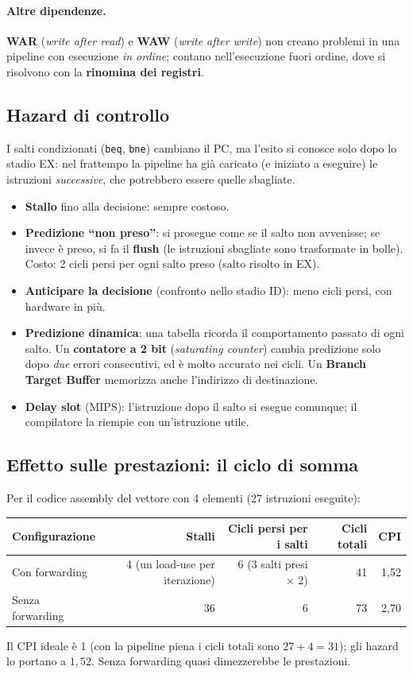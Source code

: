 \paragraph{Altre dipendenze.} \textbf{WAR} (\emph{write after read}) e \textbf{WAW} (\emph{write after write}) non creano problemi in una pipeline con esecuzione \emph{in ordine}; contano nell'esecuzione fuori ordine, dove si risolvono con la \textbf{rinomina dei registri}.

\subsection{Hazard di controllo}
I salti condizionati (\texttt{beq}, \texttt{bne}) cambiano il PC, ma l'esito si conosce solo dopo lo stadio EX: nel frattempo la pipeline ha già caricato (e iniziato a eseguire) le istruzioni \emph{successive}, che potrebbero essere quelle sbagliate.
\begin{itemize}
    \item \textbf{Stallo} fino alla decisione: sempre costoso.
    \item \textbf{Predizione ``non preso''}: si prosegue come se il salto non avvenisse; se invece è preso, si fa il \textbf{flush} (le istruzioni sbagliate sono trasformate in bolle). Costo: 2 cicli persi per ogni salto preso (salto risolto in EX).
    \item \textbf{Anticipare la decisione} (confronto nello stadio ID): meno cicli persi, con hardware in più.
    \item \textbf{Predizione dinamica}: una tabella ricorda il comportamento passato di ogni salto. Un \textbf{contatore a 2 bit} (\emph{saturating counter}) cambia predizione solo dopo \emph{due} errori consecutivi, ed è molto accurato nei cicli. Un \textbf{Branch Target Buffer} memorizza anche l'indirizzo di destinazione.
    \item \textbf{Delay slot} (MIPS): l'istruzione dopo il salto si esegue comunque; il compilatore la riempie con un'istruzione utile.
\end{itemize}

\subsection{Effetto sulle prestazioni: il ciclo di somma}
Per il codice assembly del vettore con 4 elementi (27 istruzioni eseguite):
\begin{center}
\small
\begin{tabular}{@{}lrrrr@{}}
\toprule
\textbf{Configurazione} & \textbf{Stalli} & \textbf{Cicli persi per i salti} & \textbf{Cicli totali} & \textbf{CPI} \\
\midrule
Con forwarding & 4 (un load-use per iterazione) & 6 (3 salti presi $\times$ 2) & 41 & 1{,}52 \\
Senza forwarding & 36 & 6 & 73 & 2{,}70 \\
\bottomrule
\end{tabular}
\end{center}
Il CPI ideale è 1 (con la pipeline piena i cicli totali sono $27 + 4 = 31$); gli hazard lo portano a $1{,}52$. Senza forwarding quasi dimezzerebbe le prestazioni.


